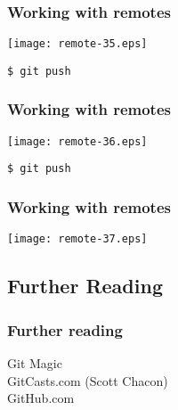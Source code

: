 \documentclass[english]{beamer}
\newcommand{\mysubsection}[2]{%
  \hypertarget{#2}{}%
  \subsection{#1}%
  \label{#2}%
}
\newcommand{\CMD}[1]{%
\texttt{\textcolor{code-green}{#1}}%
}
\newcommand{\faint}[1]{%
\textcolor{code-gray}{#1}%
}
\newcommand{\blue}[1]{%
\textcolor{code-blue}{#1}%
}
\begin{document}
\begin{frame}[fragile]
\frametitle{Working with remotes}

\texttt{[image: remote-35.eps]}

\begin{center}
\CMD{\$ git push}
\end{center}

\vspace{\textheight}
\end{frame}

\begin{frame}[fragile]
\frametitle{Working with remotes}

\texttt{[image: remote-36.eps]}

\begin{center}
\CMD{\$ git push}
\end{center}

\vspace{\textheight}
\end{frame}

\begin{frame}[fragile]
\frametitle{Working with remotes}

\texttt{[image: remote-37.eps]}

\vspace{\textheight}
\end{frame}
\mysubsection{Further Reading}{using:end}
\begin{frame}
\frametitle{Further reading}
\begin{center}
        \blue{Git Magic} \\
        \blue{GitCasts.com} \faint{(Scott Chacon)} \\
        \blue{GitHub.com} \\
\end{center}
\end{frame}

\end{document}
